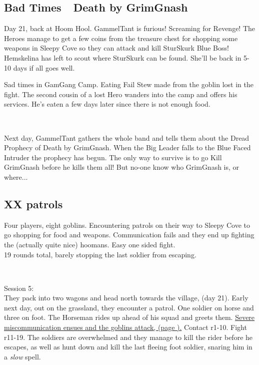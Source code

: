 \subsection*{Bad Times~\mdash~Death by GrimGnash}

Day 21, back at Hoom Hool. GammelTant is furious! Screaming for Revenge! The Heroes manage to get a few coins from the treasure chest for shopping some weapons in Sleepy Cove so they can attack and kill SturSkurk Blue Boss! Hemskelina has left to scout where SturSkurk can be found. She'll be back in 5-10 days if all goes well.

Sad times in GamGang Camp. Eating Fail Stew made from the goblin lost in the fight. The second cousin of a lost Hero wanders into the camp and offers his services. He's eaten a few days later since there is not enough food.

\

Next day, GammelTant gathers the whole band and tells them about the Dread Prophecy of Death by GrimGnash. When the Big Leader falls to the Blue Faced Intruder the prophecy has begun. The only way to survive is to go Kill GrimGnash before he kills them all! But no-one know who GrimGnash is, or where...


\subsection*{XX patrols} 

Four players, eight goblins. Encountering patrols on their way to Sleepy Cove to go shopping for food and weapons. Communication fails and they end up fighting the (actually quite nice) hoomans. Easy one sided fight.\\
19 rounds total, barely stopping the last soldier from escaping.

\

Session 5:\\                                                            %
They pack into two wagons and head north towards the village, (day 21). Early next day, out on the grassland, they encounter a patrol. One soldier on horse and three on foot. The Horseman rides up ahead of his squad and greets them. \hyperref[misunderstandings]{Severe miscommunication ensues and the goblins attack, (page \pageref{misunderstandings}).} Contact r1-10. Fight r11-19. The soldiers are overwhelmed and they manage to kill the rider before he escapes, as well as hunt down and kill the last fleeing foot soldier, snaring him in a \emph{slow} spell.

